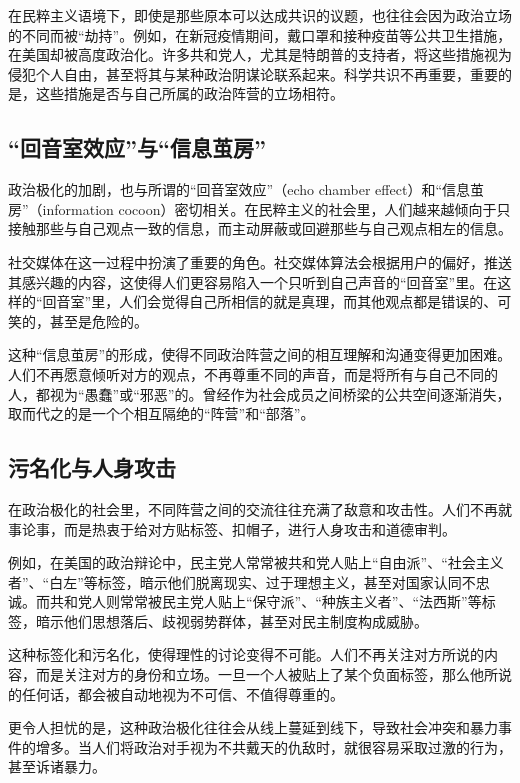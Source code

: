 在民粹主义语境下，即使是那些原本可以达成共识的议题，也往往会因为政治立场的不同而被“劫持”。例如，在新冠疫情期间，戴口罩和接种疫苗等公共卫生措施，在美国却被高度政治化。许多共和党人，尤其是特朗普的支持者，将这些措施视为侵犯个人自由，甚至将其与某种政治阴谋论联系起来。科学共识不再重要，重要的是，这些措施是否与自己所属的政治阵营的立场相符。

\subsection{“回音室效应”与“信息茧房”}

政治极化的加剧，也与所谓的“回音室效应”（echo chamber effect）和“信息茧房”（information cocoon）密切相关。在民粹主义的社会里，人们越来越倾向于只接触那些与自己观点一致的信息，而主动屏蔽或回避那些与自己观点相左的信息。

社交媒体在这一过程中扮演了重要的角色。社交媒体算法会根据用户的偏好，推送其感兴趣的内容，这使得人们更容易陷入一个只听到自己声音的“回音室”里。在这样的“回音室”里，人们会觉得自己所相信的就是真理，而其他观点都是错误的、可笑的，甚至是危险的。

这种“信息茧房”的形成，使得不同政治阵营之间的相互理解和沟通变得更加困难。人们不再愿意倾听对方的观点，不再尊重不同的声音，而是将所有与自己不同的人，都视为“愚蠢”或“邪恶”的。曾经作为社会成员之间桥梁的公共空间逐渐消失，取而代之的是一个个相互隔绝的“阵营”和“部落”。

\subsection{污名化与人身攻击}

在政治极化的社会里，不同阵营之间的交流往往充满了敌意和攻击性。人们不再就事论事，而是热衷于给对方贴标签、扣帽子，进行人身攻击和道德审判。

例如，在美国的政治辩论中，民主党人常常被共和党人贴上“自由派”、“社会主义者”、“白左”等标签，暗示他们脱离现实、过于理想主义，甚至对国家认同不忠诚。而共和党人则常常被民主党人贴上“保守派”、“种族主义者”、“法西斯”等标签，暗示他们思想落后、歧视弱势群体，甚至对民主制度构成威胁。

这种标签化和污名化，使得理性的讨论变得不可能。人们不再关注对方所说的内容，而是关注对方的身份和立场。一旦一个人被贴上了某个负面标签，那么他所说的任何话，都会被自动地视为不可信、不值得尊重的。

更令人担忧的是，这种政治极化往往会从线上蔓延到线下，导致社会冲突和暴力事件的增多。当人们将政治对手视为不共戴天的仇敌时，就很容易采取过激的行为，甚至诉诸暴力。


